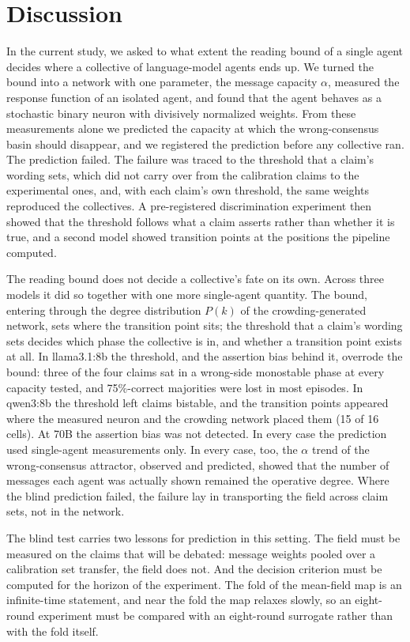 \documentclass[11pt]{article}
\begin{document}
\section{Discussion}\label{sec:discussion}

In the current study, we asked to what extent the reading bound of a
single agent decides where a collective of language-model agents ends up.
We turned the bound into a network with one parameter, the message
capacity $\alpha$, measured the response function of an isolated agent, and
found that the agent behaves as a stochastic binary neuron with divisively
normalized weights. From these measurements alone we predicted the
capacity at which the wrong-consensus basin should disappear, and we
registered the prediction before any collective ran. The prediction
failed. The failure was traced to the threshold that a claim's wording
sets, which did not carry over from the calibration claims to the
experimental ones, and, with each claim's own threshold, the same weights
reproduced the collectives. A pre-registered discrimination experiment then
showed that the threshold follows what a claim asserts rather than whether
it is true, and a second model showed transition points at the positions
the pipeline computed.

The reading bound does not decide a collective's fate on its own. Across
three models it did so together with one more single-agent quantity. The
bound, entering through the degree distribution $P(k)$ of the
crowding-generated network, sets where the transition point sits; the
threshold that a claim's wording sets decides which phase the collective is
in, and whether a transition point exists at all. In llama3.1:8b the
threshold, and the assertion bias behind it, overrode the bound: three of
the four claims sat in a wrong-side monostable phase at every capacity
tested, and 75\%-correct majorities were lost in most episodes. In qwen3:8b
the threshold left claims bistable, and the transition points appeared
where the measured neuron and the crowding network placed them (15 of 16
cells). At 70B the assertion bias was not detected. In every case the
prediction used single-agent measurements only. In every case, too, the
$\alpha$ trend of the wrong-consensus attractor, observed and predicted,
showed that the number of messages each agent was actually shown remained
the operative degree. Where the blind prediction failed, the failure lay
in transporting the field across claim sets, not in the network.

The blind test carries two lessons for prediction in this setting. The
field must be measured on the claims that will be debated: message weights
pooled over a calibration set transfer, the field does not. And the
decision criterion must be computed for the horizon of the experiment. The
fold of the mean-field map is an infinite-time statement, and near the fold
the map relaxes slowly, so an eight-round experiment must be compared with
an eight-round surrogate rather than with the fold itself.
\end{document}

